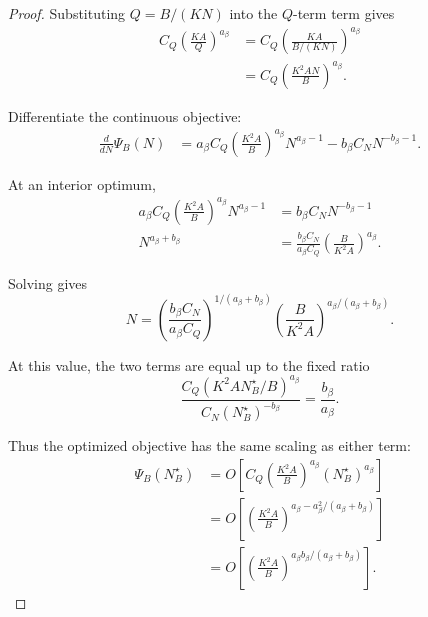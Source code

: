 \documentclass{article} %
\begin{document}
\begin{proof}
Substituting \(Q=B/(KN)\) into the \(Q\)-term term gives
\begin{align}
C_Q\left(\frac{KA}{Q}\right)^{a_\beta}
&=
C_Q
\left(
\frac{KA}{B/(KN)}
\right)^{a_\beta}
\label{eq:budget-proof-sub-a}
\\
&=
C_Q
\left(
\frac{K^2AN}{B}
\right)^{a_\beta}.
\label{eq:budget-proof-sub-b}
\end{align}

Differentiate the continuous objective:
\begin{align}
\frac{d}{dN}\Psi_B(N)
&=
a_\beta C_Q
\left(\frac{K^2A}{B}\right)^{a_\beta}
N^{a_\beta-1}
-
b_\beta C_N
N^{-b_\beta-1}.
\label{eq:budget-proof-deriv}
\end{align}

At an interior optimum,
\begin{align}
a_\beta C_Q
\left(\frac{K^2A}{B}\right)^{a_\beta}
N^{a_\beta-1}
&=
b_\beta C_N
N^{-b_\beta-1}
\label{eq:budget-proof-stat-a}
\\
N^{a_\beta+b_\beta}
&=
\frac{b_\beta C_N}{a_\beta C_Q}
\left(\frac{B}{K^2A}\right)^{a_\beta}.
\label{eq:budget-proof-stat-b}
\end{align}

Solving gives
\begin{equation}
\label{eq:budget-proof-Nstar}
N
=
\left(
\frac{b_\beta C_N}{a_\beta C_Q}
\right)^{1/(a_\beta+b_\beta)}
\left(
\frac{B}{K^2A}
\right)^{a_\beta/(a_\beta+b_\beta)}.
\end{equation}

At this value, the two terms are equal up to the fixed ratio
\begin{equation}
\label{eq:budget-proof-ratio}
\frac{
C_Q(K^2AN_B^\star/B)^{a_\beta}
}{
C_N(N_B^\star)^{-b_\beta}
}
=
\frac{b_\beta}{a_\beta}.
\end{equation}

Thus the optimized objective has the same scaling as either term:
\begin{align}
\Psi_B(N_B^\star)
&=
O\!\left[
C_Q
\left(
\frac{K^2A}{B}
\right)^{a_\beta}
(N_B^\star)^{a_\beta}
\right]
\label{eq:budget-proof-rate-a}
\\
&=
O\!\left[
\left(
\frac{K^2A}{B}
\right)^{
a_\beta-a_\beta^2/(a_\beta+b_\beta)
}
\right]
\label{eq:budget-proof-rate-b}
\\
&=
O\!\left[
\left(
\frac{K^2A}{B}
\right)^{
a_\beta b_\beta/(a_\beta+b_\beta)
}
\right].
\label{eq:budget-proof-rate-c}
\end{align}


\end{proof}
\end{document}
